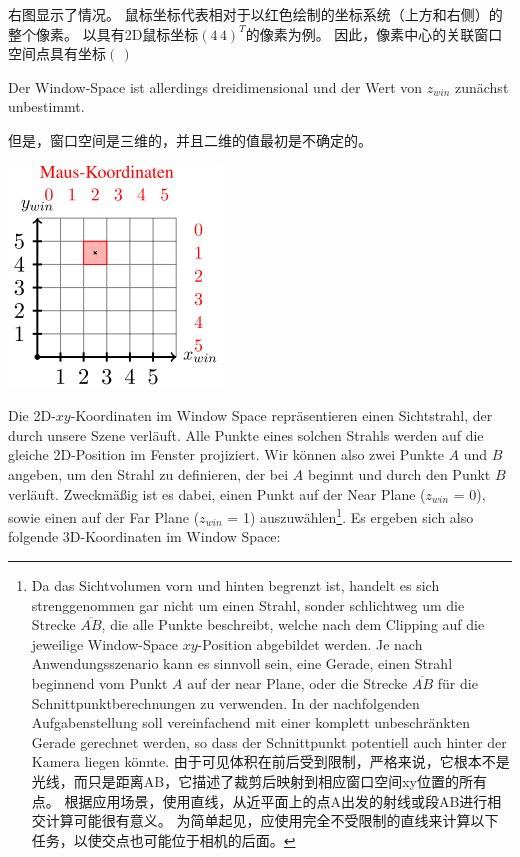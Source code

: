 \documentclass[fleqn]{article}
\begin{document}
右图显示了情况。 鼠标坐标代表相对于以红色绘制的坐标系统（上方和右侧）的整个像素。 以具有2D鼠标坐标$(4\, 4)^T$的像素为例。 因此，像素中心的关联窗口空间点具有坐标$(\,)$

Der Window-Space ist allerdings dreidimensional und der Wert von $z_{win}$ zunächst unbestimmt.

但是，窗口空间是三维的，并且二维的值最初是不确定的。

\begin{center}
    \includegraphics[scale=0.6]{22.png}
\end{center}

Die 2D-$xy$-Koordinaten im Window Space repräsentieren einen Sichtstrahl,
 der durch unsere Szene verläuft. Alle Punkte eines solchen Strahls werden auf 
 die gleiche 2D-Position im Fenster projiziert. Wir können also zwei Punkte 
 $A$ und $B$ angeben, um den Strahl zu definieren, der bei $A$ beginnt und durch den 
 Punkt $B$ verläuft. Zweckmäßig ist es dabei, einen Punkt auf der Near Plane 
 ($z_{win}$ = 0), sowie einen auf der Far Plane ($z_{win}$ = 1) auszuwählen\footnote{Da das Sichtvolumen vorn und hinten begrenzt ist, handelt es sich strenggenommen gar nicht um einen Strahl, sonder schlichtweg um die Strecke $\overline{AB}$, die alle Punkte beschreibt, welche nach dem Clipping auf die jeweilige Window-Space $xy$-Position abgebildet werden. Je nach Anwendungsszenario kann es sinnvoll sein, eine Gerade, einen Strahl beginnend vom Punkt $A$ auf der near Plane, oder die Strecke $\overline{AB}$ für die Schnittpunktberechnungen zu verwenden. In der nachfolgenden Aufgabenstellung soll vereinfachend mit einer komplett unbeschränkten Gerade gerechnet werden, so dass der Schnittpunkt potentiell auch hinter der Kamera liegen könnte. 由于可见体积在前后受到限制，严格来说，它根本不是光线，而只是距离AB，它描述了裁剪后映射到相应窗口空间xy位置的所有点。 根据应用场景，使用直线，从近平面上的点A出发的射线或段AB进行相交计算可能很有意义。 为简单起见，应使用完全不受限制的直线来计算以下任务，以使交点也可能位于相机的后面。}. 
 Es ergeben sich also folgende 3D-Koordinaten im Window Space:
\end{document}
